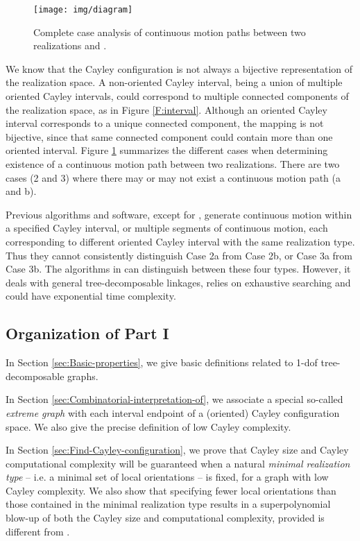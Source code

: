 \documentclass[secthm,amsthm,english]{article}
\theoremstyle{definition}
\theoremstyle{remark}
\begin{document}
	\begin{figure}[hbtp]
	\centering
	\texttt{[image: img/diagram]}
	\caption{Complete case analysis of continuous motion paths between two realizations  and . 
}
	\label{fig:diagram}
	\end{figure}

	We know that the Cayley configuration is not always a bijective representation of the realization space. 
A non-oriented Cayley interval, being a union of multiple oriented Cayley intervals, 
	could correspond to multiple connected components of the realization space, 
	as in Figure \ref{F:interval}. 
Although an oriented Cayley interval corresponds to a unique connected component, 
	the mapping is not bijective, since that same connected component could contain more than one oriented interval.
	Figure \ref{fig:diagram} summarizes the different cases when 
	determining existence of a continuous motion path between two realizations. 
	There are two cases (2 and 3) where there may or may not exist a continuous motion path (a and b).
	
	Previous algorithms and software, except for \cite{bib:hidalgo2011reachability},
	generate continuous motion within a specified Cayley interval, 
	or multiple segments of continuous motion, 
	each corresponding to different oriented Cayley interval with the same realization type. 
Thus they cannot consistently distinguish Case 2a from Case 2b, or Case 3a from Case 3b. The algorithms in \cite{bib:hidalgo2011reachability} can distinguish between these four types. 
	However, it deals with general tree-decomposable linkages, relies on exhaustive searching
	 and could have exponential time complexity.









\subsection{Organization of Part I}

In Section \ref{sec:Basic-properties}, we give basic definitions 
related to 1-dof tree-decomposable graphs. 

In Section \ref{sec:Combinatorial-interpretation-of}, we associate a special so-called \emph{extreme graph} with each interval endpoint of a (oriented) Cayley configuration space. We also give the precise definition of low Cayley complexity.  

In Section \ref{sec:Find-Cayley-configuration}, we prove that 
 Cayley size and  Cayley computational complexity will be guaranteed
when a natural \emph{minimal realization type} -- i.e. a minimal set of local orientations -- is fixed, 
for a graph with low Cayley complexity. 
We also show that specifying fewer local orientations than those contained in the minimal realization type results in a
superpolynomial blow-up of  both the Cayley size and computational complexity, provided  is different
from .
\end{document}
